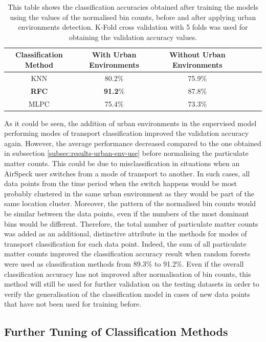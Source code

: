 \documentclass[bsc,frontabs,twoside,singlespacing,parskip,deptreport]{infthesis}     %
\begin{document}
\begin{table}[h!]
\centering
 \begin{tabular}{||c | c | c | c | c | c||} 
 \hline
 Classification Method & With Urban Environments & Without Urban Environments \\ [0.5ex] 
 \hline\hline
 KNN & 80.2\% & 75.9\% \\
 \hline
 \textbf{RFC} & \textbf{91.2}\% & 87.8\% \\ 
 \hline
  MLPC & 75.4\% & 73.3\% \\ 
 \hline
\end{tabular}
\caption{This table shows the classification accuracies obtained after training the models using the values of the normalised bin counts, before and after applying urban environments detection. K-Fold cross validation with 5 folds was used for obtaining the validation accuracy values.}
\label{table:norm-bin-counts}
\end{table}

As it could be seen, the addition of urban environments in the supervised model performing modes of transport classification improved the validation accuracy again. However, the average performance decreased compared to the one obtained  in subsection \ref{subsec:results-urban-env-use} before normalising the particulate matter counts. This could be due to misclassification in situations when an AirSpeck user switches from a mode of transport to another. In such cases, all data points from the time period when the switch happens would be most probably clustered in the same urban environment as they would be part of the same location cluster. Moreover, the pattern of the normalised bin counts would be similar between the data points, even if the numbers of the most dominant bins would be different. Therefore, the total number of particulate matter counts was added as an additional, distinctive attribute in the methods for modes of transport classification for each data point. Indeed, the sum of all particulate matter counts improved the classification accuracy result when random forests were used as classification methods from 89.3\% to 91.2\%. Even if the overall classification accuracy has not improved after normalisation of bin counts, this method will still be used for further validation on the testing datasets in order to verify the generalisation of the classification model in cases of new data points that have not been used for training before. 


\subsection{Further Tuning of Classification Methods}
\label{subsec:classifier-tweaking}
\end{document}
